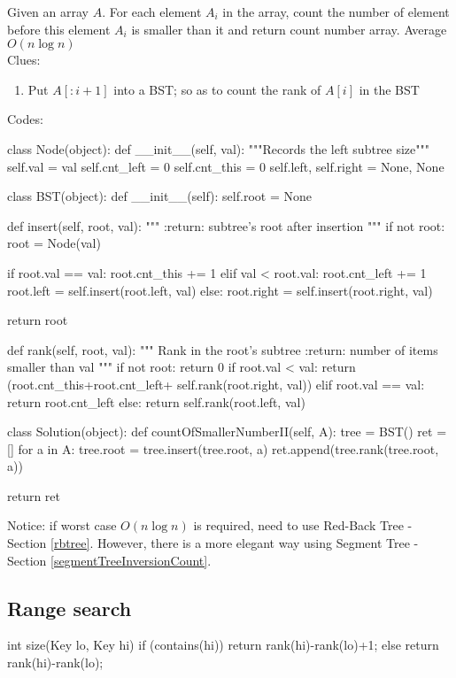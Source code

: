  Given an array $A$. For each element $A_i$ in the array, count the number of element before this element $A_i$ is smaller than it and return count number array. Average $O(n \log n)$
\\
Clues:
\begin{enumerate}
\item Put $A[:i+1]$ into a BST; so as to count the rank of $A[i]$ in the BST
\end{enumerate}
Codes:
\begin{python}
class Node(object):
  def __init__(self, val):
    """Records the left subtree size"""
    self.val = val
    self.cnt_left = 0
    self.cnt_this = 0
    self.left, self.right = None, None


class BST(object):
  def __init__(self):
    self.root = None

  def insert(self, root, val):
    """
    :return: subtree's root after insertion
    """
    if not root:
      root = Node(val)

    if root.val == val:
      root.cnt_this += 1
    elif val < root.val:
      root.cnt_left += 1
      root.left = self.insert(root.left, val)
    else:
      root.right = self.insert(root.right, val)

    return root

  def rank(self, root, val):
    """
    Rank in the root's subtree
    :return: number of items smaller than val
    """
    if not root:
      return 0
    if root.val < val:
      return (root.cnt_this+root.cnt_left+
              self.rank(root.right, val))
    elif root.val == val:
      return root.cnt_left
    else:
      return self.rank(root.left, val)


class Solution(object):
  def countOfSmallerNumberII(self, A):
    tree = BST()
    ret = []
    for a in A:
      tree.root = tree.insert(tree.root, a)
      ret.append(tree.rank(tree.root, a))

    return ret
\end{python}
Notice: if worst case $O(n \log n)$ is required, need to use Red-Back Tree - Section \ref{rbtree}. However, there is a more elegant way using Segment Tree - Section \ref{segmentTreeInversionCount}.


\subsection{Range search}
\begin{java}
int size(Key lo, Key hi) {
    if (contains(hi)) return rank(hi)-rank(lo)+1;
    else              return rank(hi)-rank(lo);
}
\end{java}

